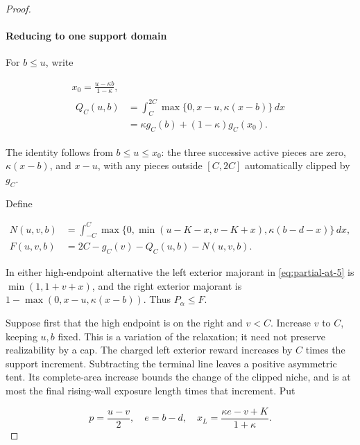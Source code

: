 \begin{proof}
\paragraph{Reducing to one support domain}

For \(b\le u\), write

\begin{equation}\label{eq:partial-at-14}
\begin{gathered}
x_0=\frac{u-\kappa b}{1-\kappa},\\
\begin{aligned}
Q_C(u,b)&=\int_C^{2C}\max\{0,x-u,\kappa(x-b)\}\,dx\\
&=\kappa g_C(b)+(1-\kappa)g_C(x_0).
\end{aligned}
\end{gathered}
\end{equation}

The identity follows from \(b\le u\le x_0\): the three successive
active pieces are zero, \(\kappa(x-b)\), and \(x-u\), with any
pieces outside \([C,2C]\) automatically clipped by \(g_C\).

Define

\begin{equation}\label{eq:partial-at-15}
\begin{aligned}
N(u,v,b)&=\int_{-C}^C
\max\{0,\min(u-K-x,v-K+x),\kappa(b-d-x)\}\,dx,\\
F(u,v,b)&=2C-g_C(v)-Q_C(u,b)-N(u,v,b).
\end{aligned}
\end{equation}

In either high-endpoint alternative the left exterior majorant in \eqref{eq:partial-at-5}
is \(\min(1,1+v+x)\), and the right exterior majorant is
\(1-\max(0,x-u,\kappa(x-b))\). Thus
\(P_\alpha\le F\).

Suppose first that the high endpoint is on the right and \(v<C\).
Increase \(v\) to \(C\), keeping \(u,b\) fixed. This is a variation
of the relaxation; it need not preserve realizability by a cap. The
charged left exterior reward increases by \(C\) times the support
increment. Subtracting the terminal line leaves a positive asymmetric
tent. Its complete-area increase bounds the change of the clipped niche,
and is at most the final rising-wall exposure length times that increment. Put

\begin{equation}\label{eq:partial-at-16}
p=\frac{u-v}{2},\quad e=b-d,\quad
x_L=\frac{\kappa e-v+K}{1+\kappa}.
\end{equation}


\end{proof}
